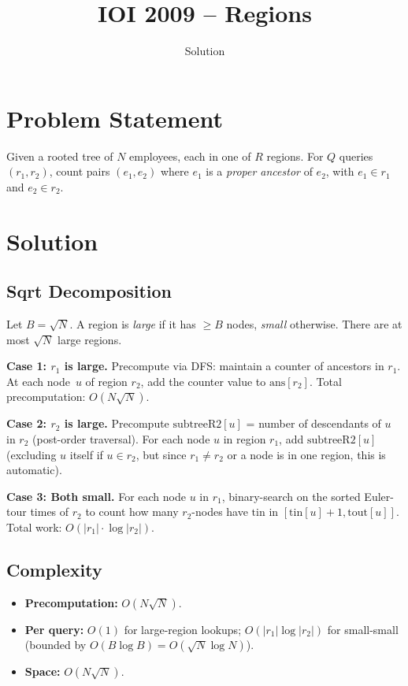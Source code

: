 \documentclass[11pt,a4paper]{article}
\title{IOI 2009 -- Regions}
\author{Solution}
\date{}
\begin{document}
\maketitle

\section{Problem Statement}
Given a rooted tree of $N$ employees, each in one of $R$ regions. For $Q$ queries $(r_1, r_2)$, count pairs $(e_1, e_2)$ where $e_1$ is a \emph{proper ancestor} of $e_2$, with $e_1 \in r_1$ and $e_2 \in r_2$.

\section{Solution}

\subsection{Sqrt Decomposition}
Let $B = \sqrt{N}$. A region is \emph{large} if it has $\ge B$ nodes, \emph{small} otherwise. There are at most $\sqrt{N}$ large regions.

\textbf{Case 1: $r_1$ is large.} Precompute via DFS: maintain a counter of ancestors in $r_1$. At each node~$u$ of region $r_2$, add the counter value to $\text{ans}[r_2]$. Total precomputation: $O(N \sqrt{N})$.

\textbf{Case 2: $r_2$ is large.} Precompute $\text{subtreeR2}[u]$ = number of descendants of $u$ in $r_2$ (post-order traversal). For each node $u$ in region $r_1$, add $\text{subtreeR2}[u]$ (excluding $u$ itself if $u \in r_2$, but since $r_1 \ne r_2$ or a node is in one region, this is automatic).

\textbf{Case 3: Both small.} For each node $u$ in $r_1$, binary-search on the sorted Euler-tour times of $r_2$ to count how many $r_2$-nodes have $\text{tin}$ in $[\text{tin}[u]+1, \text{tout}[u]]$. Total work: $O(|r_1| \cdot \log |r_2|)$.

\subsection{Complexity}
\begin{itemize}
    \item \textbf{Precomputation:} $O(N\sqrt{N})$.
    \item \textbf{Per query:} $O(1)$ for large-region lookups; $O(|r_1| \log |r_2|)$ for small-small (bounded by $O(B \log B) = O(\sqrt{N} \log N)$).
    \item \textbf{Space:} $O(N\sqrt{N})$.
\end{itemize}
\end{document}
